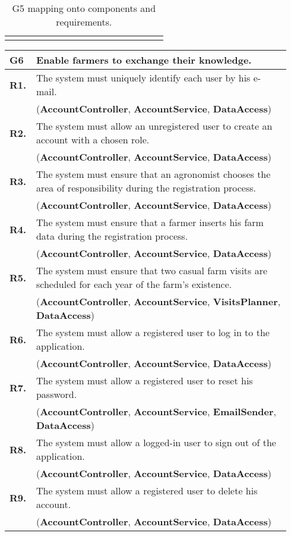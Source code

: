\begin{longtable}{p{0.06\linewidth} p{0.88\linewidth}}
    \bottomrule
    \caption{G5 mapping onto components and requirements.}
\end{longtable}

\begin{longtable}{p{0.06\linewidth} p{0.88\linewidth}} 
    \toprule
    \textbf{G6} & Enable farmers to exchange their knowledge. \\ 
    \midrule
    
	\textbf{R1.} & The system must uniquely identify each user by his e-mail. \\
	& (\textbf{AccountController}, \textbf{AccountService}, \textbf{DataAccess})\\
	\textbf{R2.} & The system must allow an unregistered user to create an account with a chosen role. \\
	& (\textbf{AccountController}, \textbf{AccountService}, \textbf{DataAccess})\\
	\textbf{R3.} & The system must ensure that an agronomist chooses the area of responsibility during the registration process. \\
	& (\textbf{AccountController}, \textbf{AccountService}, \textbf{DataAccess})\\
	\textbf{R4.} & The system must ensure that a farmer inserts his farm data during the registration process.\\
	& (\textbf{AccountController}, \textbf{AccountService}, \textbf{DataAccess})\\
	\textbf{R5.} & The system must ensure that two casual farm visits are scheduled for each year of the farm's existence.\\
	& (\textbf{AccountController}, \textbf{AccountService}, \textbf{VisitsPlanner}, \todo{what about rejected?}
	\textbf{DataAccess})\\
	\textbf{R6.} & The system must allow a registered user to log in to the application. \\
	& (\textbf{AccountController}, \textbf{AccountService}, \textbf{DataAccess})\\
	\textbf{R7.} & The system must allow a registered user to reset his password. \\
	& (\textbf{AccountController}, \textbf{AccountService}, \textbf{EmailSender}, \textbf{DataAccess})\\
	\textbf{R8.} & The system must allow a logged-in user to sign out of the application. \\
	& (\textbf{AccountController}, \textbf{AccountService}, \textbf{DataAccess}) \todo{stateless?}\\
	\textbf{R9.} & The system must allow a registered user to delete his account. \\
	& (\textbf{AccountController}, \textbf{AccountService}, \textbf{DataAccess})\\
	

\end{longtable}
